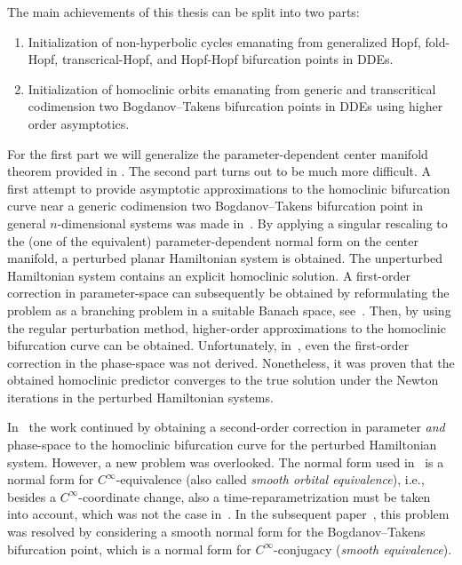 The main achievements of this thesis can be split into two parts:
\begin{enumerate}[label=\Roman*.]
    \item Initialization of non-hyperbolic cycles emanating from generalized
        Hopf, fold-Hopf, transcrical-Hopf, and Hopf-Hopf bifurcation points in DDEs.
    \item Initialization of homoclinic orbits emanating from generic and transcritical
        codimension two Bogdanov--Takens bifurcation points in DDEs using higher order
        asymptotics.
\end{enumerate}

For the first part we will generalize the parameter-dependent center manifold
theorem provided in \cite{diekmann1995delay}. The second part turns out to be
much more difficult. A first attempt to provide asymptotic approximations to the
homoclinic bifurcation curve near a generic codimension two Bogdanov--Takens
bifurcation point in general $n$-dimensional systems was made
in~\cite{Beyn_1994}. By applying a singular rescaling to the (one of the
equivalent) parameter-dependent normal form on the center manifold, a perturbed
planar Hamiltonian system is obtained. The unperturbed Hamiltonian system
contains an explicit homoclinic solution. A first-order correction in
parameter-space can subsequently be obtained by reformulating the problem as a
branching problem in a suitable Banach space, see~\cite{Beyn_1994}.  Then, by
using the regular perturbation method, higher-order approximations to the
homoclinic bifurcation curve can be obtained. Unfortunately, in~\cite{Beyn_1994},
even the first-order correction in the phase-space was not derived.  Nonetheless,
it was proven that the obtained homoclinic predictor converges to the true
solution under the Newton iterations in the perturbed Hamiltonian systems.

In~\cite{Kuznetsov2014improved} the work continued by obtaining a second-order
correction in parameter \emph{and} phase-space to the homoclinic bifurcation
curve for the perturbed Hamiltonian system. However, a new problem was
overlooked.  The normal form used in~\cite{Kuznetsov2014improved} is a normal
form for $C^\infty$-equivalence (also called \emph{smooth orbital equivalence}),
i.e., besides a $C^\infty$-coordinate change, also a time-reparametrization must
be taken into account, which was not the case in~\cite{Kuznetsov2014improved}. In
the subsequent paper~\cite{Gray-Scott2015}, this problem was resolved by
considering a smooth normal form for the Bogdanov--Takens bifurcation point,
which is a normal form for $C^\infty$-conjugacy (\emph{smooth equivalence}). 

